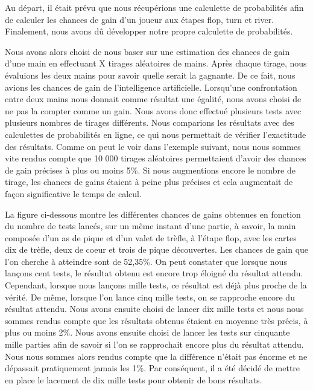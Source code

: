 \documentclass{report}
\begin{document}
Au départ, il était prévu que nous récupérions une calculette de probabilités afin de calculer les chances de gain d'un joueur aux étapes flop, turn et river. Finalement, nous avons dû développer notre propre calculette de probabilités.\par
Nous avons alors choisi de nous baser sur une estimation des chances de gain d'une main en effectuant X tirages aléatoires de mains. Après chaque tirage, nous évaluions les deux mains pour savoir quelle serait la gagnante. De ce fait, nous avions les chances de gain de l'intelligence artificielle. Lorsqu'une confrontation entre deux mains nous donnait comme résultat une égalité, nous avons choisi de ne pas la compter comme un gain.
Nous avons donc effectué plusieurs tests avec plusieurs nombres de tirages différents. Nous comparions les résultats avec des calculettes de probabilités en ligne, ce qui nous permettait de vérifier l'exactitude des résultats.
Comme on peut le voir dans l'exemple suivant, nous nous sommes vite rendus compte que 10 000 tirages aléatoires permettaient d'avoir des chances de gain précises à plus ou moins 5\%. Si nous augmentions encore le nombre de tirage, les chances de gains étaient à peine plus précises et cela augmentait de façon significative le temps de calcul. \par

La figure ci-dessous montre les différentes chances de gains obtenues en fonction du nombre de tests lancés, sur un même instant d'une partie, à savoir, la main composée d'un as de pique et d'un valet de trèfle, à l'étape flop, avec les cartes dix de trèfle, deux de coeur et trois de pique découvertes. Les chances de gain que l'on cherche à atteindre sont de 52,35\%. On peut constater que lorsque nous lançons cent tests, le résultat obtenu est encore trop éloigné du résultat attendu. Cependant, lorsque nous lançons mille tests, ce résultat est déjà plus proche de la vérité. De même, lorsque l'on lance cinq mille tests, on se rapproche encore du résultat attendu. Nous avons ensuite choisi de lancer dix mille tests et nous nous sommes rendus compte que les résultats obtenus étaient en moyenne très précis, à plus ou moins 2\%. Nous avons ensuite choisi de lancer les tests sur cinquante mille parties afin de savoir si l'on se rapprochait encore plus du résultat attendu. Nous nous sommes alors rendus compte que la différence n'était pas énorme et ne dépassait pratiquement jamais les 1\%. Par conséquent, il a été décidé de mettre en place le lacement de dix mille tests pour obtenir de bons résultats.\par
\end{document}
